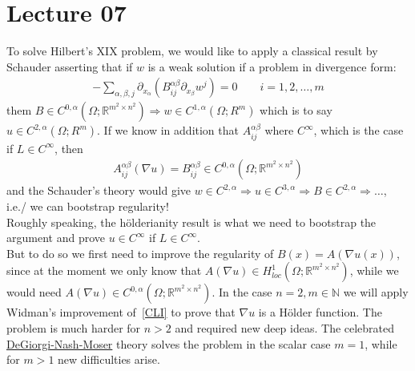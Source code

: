 \chapter{Lecture 07}

To solve Hilbert's XIX problem, we would like to apply a classical result by Schauder asserting that if \( w \) is a weak solution if a problem in divergence form:
\begin{gather}
	- \sum\limits_{\alpha ,\beta ,j}^{} \partial_{x_{\alpha }} \left( B_{ij}^{\alpha \beta } \partial_{x_{\beta }} w^{j} \right) = 0\qquad i = 1,2,\ldots,m
\end{gather}
them \( B \in  C^{0, \alpha }(\Omega ; \mathbb{R}^{m^{2} \times n^{2}}) \Rightarrow w \in C^{1, \alpha }(\Omega ; R^{m}) \) which is to say \( u \in C^{2, \alpha }(\Omega ; R^{m}) \). If we know in addition that \( A_{ij}^{\alpha \beta } \) where \( C^{\infty } \), which is the case if \( L \in  C^{\infty } \), then
\begin{gather}
	A_{ij}^{\alpha \beta }(\nabla u) = B_{ij}^{\alpha \beta } \in C^{0, \alpha }(\Omega ; \mathbb{R}^{m^{2} \times n^{2}})
\end{gather}
and the Schauder's theory would give \( w \in C^{2, \alpha } \Rightarrow u \in C^{3, \alpha } \Rightarrow B \in C^{2, \alpha } \Rightarrow \ldots \), i.e./ we can bootstrap regularity! \\
Roughly speaking, the hölderianity result is what we need to bootstrap the argument and prove \( u \in  C^{\infty } \) if \( L \in C^{\infty } \). \\
But to do so we first need to improve the regularity of \( B(x) = A(\nabla u(x))	\), since at the moment we only know that \( A(\nabla u ) \in H_{loc}^{1}(\Omega ; \mathbb{R}^{m^{2} \times n^{2}}) \), while we would need \( A(\nabla u ) \in C^{0, \alpha }(\Omega ; \mathbb{R}^{m^{2} \times n^{2}})  \). In the case \( n=2, m \in  \mathbb{N} \) we will apply Widman's improvement of~\eqref{CLI} to prove that \( \nabla u \) is a Hölder function. The problem is much harder for \( n >2 \) and required new deep ideas. The celebrated \underline{DeGiorgi-Nash-Moser} theory solves the problem in the scalar case \( m=1 \), while for \( m >1 \) new difficulties arise.